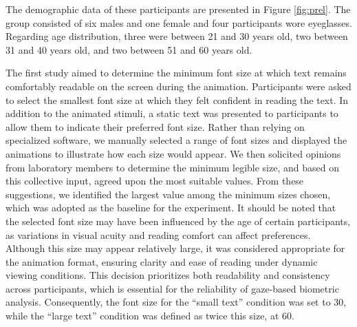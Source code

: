 \documentclass{article}
\begin{document}
The demographic data of these participants are presented in Figure \ref{fig:prel}. 
The group consisted of six males and one female and four participants wore eyeglasses. 
Regarding age distribution, three were between 21 and 30 years old, two between 31 and 40 years old, and two between 51 and 60 years old.

The first study aimed to determine the minimum font size at which text remains comfortably readable on the screen during the animation. 
Participants were asked to select the smallest font size at which they felt confident in reading the text. 
In addition to the animated stimuli, a static text was presented to participants to allow them to indicate their preferred font size. 
Rather than relying on specialized software, we manually selected a range of font sizes and displayed the animations to illustrate how each size would appear.
We then solicited opinions from laboratory members to determine the minimum legible size, and based on this collective input, agreed upon the most suitable values.
From these suggestions, we identified the largest value among the minimum sizes chosen, which was adopted as the baseline for the experiment. 
It should be noted that the selected font size may have been influenced by the age of certain participants, as variations in visual acuity and reading comfort can affect preferences. 
Although this size may appear relatively large, it was considered appropriate for the animation format, ensuring clarity and ease of reading under dynamic viewing conditions. 
This decision prioritizes both readability and consistency across participants, which is essential for the reliability of gaze-based biometric analysis. 
Consequently, the font size for the “small text” condition was set to 30, while the “large text” condition was defined as twice this size, at 60.
\end{document}
